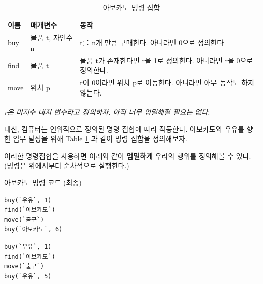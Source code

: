 \documentclass{article}
\begin{document}
\begin{table}[!h]
    \centering

    \caption{아보카도 명령 집합}
    \label{Tab:avocado-isa}

    \begin{tabular}{ || m{2em} | m{3.8em} | m{22em} || }
        \hline
        이름 & 매개변수 & 동작 \\
        \hline\hline
        buy & 물품 t, 자연수 n & t를 n개 만큼 구매한다. 아니라면 0으로 정의한다 \\
        \hline
        find & 물품 t & 물품 t가 존재한다면 r을 1로 정의한다. 아니라면 r을 0으로 정의한다. \\
        \hline
        move & 위치 p & r이 0이라면 위치 p로 이동한다. 아니라면 아무 동작도 하지 않는다. \\
        \hline
    \end{tabular}
    \newline
    \textit{\color{gray} \small r은 미지수 내지 변수라고 정의하자.
    아직 너무 엄밀해질 필요는 없다.}
\end{table}

대신, 컴퓨터는 인위적으로 정의된 명령 집합에 따라 작동한다. 아보카도와
우유를 향한 임무 달성을 위해 Table \ref{Tab:avocado-isa} 과 같이 명령
집합을 정의해보자.

이러한 명령집합을 사용하면 아래와 같이 \textbf{엄밀하게} 우리의 행위를
정의해볼 수 있다. (명령은 위에서부터 순차적으로 실행한다.)

\begin{center}

    \centering

    아보카도 명령 코드 (최종)

    \begin{minipage}{0.45\textwidth}
        \begin{lstlisting}[escapeinside=``]
buy(`우유`, 1)
find(`아보카도`)
move(`출구`)
buy(`아보카도`, 6)
        \end{lstlisting}
    \end{minipage}
    \hfill
    \begin{minipage}{0.45\textwidth}
        \begin{lstlisting}[escapeinside=``]
buy(`우유`, 1)
find(`아보카도`)
move(`출구`)
buy(`우유`, 5)
        \end{lstlisting}
    \end{minipage}

\end{center}
\end{document}
